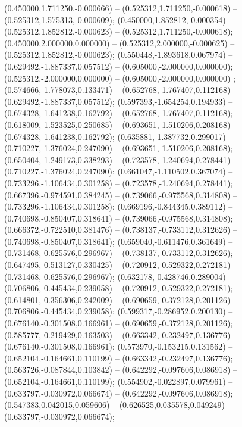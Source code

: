  (0.450000,1.711250,-0.000666) -- (0.525312,1.711250,-0.000618) -- (0.525312,1.575313,-0.000609);
 (0.450000,1.852812,-0.000354) -- (0.525312,1.852812,-0.000623) -- (0.525312,1.711250,-0.000618);
 (0.450000,2.000000,0.000000) -- (0.525312,2.000000,-0.000625) -- (0.525312,1.852812,-0.000623);
 (0.550448,-1.893618,0.067974) -- (0.629492,-1.887337,0.057512) -- (0.605000,-2.000000,0.000000);
 (0.525312,-2.000000,0.000000) -- (0.605000,-2.000000,0.000000) ;
 (0.574666,-1.778073,0.133471) -- (0.652768,-1.767407,0.112168) -- (0.629492,-1.887337,0.057512);
 (0.597393,-1.654254,0.194933) -- (0.674328,-1.641238,0.162792) -- (0.652768,-1.767407,0.112168);
 (0.618009,-1.523525,0.250685) -- (0.693651,-1.510206,0.208168) -- (0.674328,-1.641238,0.162792);
 (0.635881,-1.387732,0.299017) -- (0.710227,-1.376024,0.247090) -- (0.693651,-1.510206,0.208168);
 (0.650404,-1.249173,0.338293) -- (0.723578,-1.240694,0.278441) -- (0.710227,-1.376024,0.247090);
 (0.661047,-1.110502,0.367074) -- (0.733296,-1.106434,0.301258) -- (0.723578,-1.240694,0.278441);
 (0.667396,-0.974591,0.384245) -- (0.739066,-0.975568,0.314808) -- (0.733296,-1.106434,0.301258);
 (0.669196,-0.844345,0.389112) -- (0.740698,-0.850407,0.318641) -- (0.739066,-0.975568,0.314808);
 (0.666372,-0.722510,0.381476) -- (0.738137,-0.733112,0.312626) -- (0.740698,-0.850407,0.318641);
 (0.659040,-0.611476,0.361649) -- (0.731468,-0.625576,0.296967) -- (0.738137,-0.733112,0.312626);
 (0.647495,-0.513127,0.330425) -- (0.720912,-0.529322,0.272181) -- (0.731468,-0.625576,0.296967);
 (0.632178,-0.428746,0.289004) -- (0.706806,-0.445434,0.239058) -- (0.720912,-0.529322,0.272181);
 (0.614801,-0.356306,0.242009) -- (0.690659,-0.372128,0.201126) -- (0.706806,-0.445434,0.239058);
 (0.599317,-0.286952,0.200130) -- (0.676140,-0.301508,0.166961) -- (0.690659,-0.372128,0.201126);
 (0.585777,-0.219429,0.163503) -- (0.663342,-0.232497,0.136776) -- (0.676140,-0.301508,0.166961);
 (0.573970,-0.153215,0.131562) -- (0.652104,-0.164661,0.110199) -- (0.663342,-0.232497,0.136776);
 (0.563726,-0.087844,0.103842) -- (0.642292,-0.097606,0.086918) -- (0.652104,-0.164661,0.110199);
 (0.554902,-0.022897,0.079961) -- (0.633797,-0.030972,0.066674) -- (0.642292,-0.097606,0.086918);
 (0.547383,0.042015,0.059606) -- (0.626525,0.035578,0.049249) -- (0.633797,-0.030972,0.066674);
